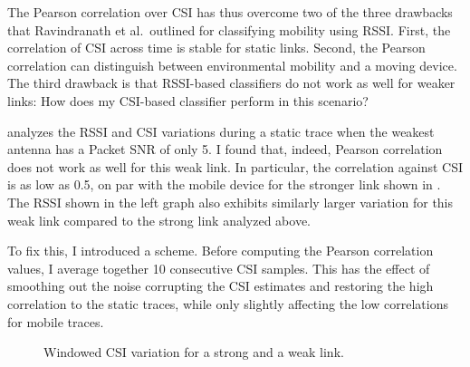 The Pearson correlation over CSI has thus overcome two of the three drawbacks that Ravindranath et al.\ outlined for classifying mobility using RSSI. First, the correlation of CSI across time is stable for static links. Second, the Pearson correlation can distinguish between environmental mobility and a moving device. The third drawback is that RSSI-based classifiers do not work as well for weaker links: How does my CSI-based classifier perform in this scenario? 

 analyzes the RSSI and CSI variations during a static trace when the weakest antenna has a Packet SNR of only 5\dB. I found that, indeed, Pearson correlation does not work as well for this weak link. In particular, the correlation against CSI is as low as 0.5, on par with the mobile device for the stronger link shown in . The RSSI shown in the left graph also exhibits similarly larger variation for this weak link compared to the strong link analyzed above.

To fix this, I introduced a  scheme. Before computing the Pearson correlation values, I average together 10 consecutive CSI samples. This has the effect of smoothing out the noise corrupting the CSI estimates and restoring the high correlation to the static traces, while only slightly affecting the low correlations for mobile traces.

\begin{figure}[tp]
	\centering
	\hspace{0.03\textwidth}%
	\caption[Windowed CSI variation for a strong and a weak link]{\label{fig:mobility_csi_cdf}Windowed CSI variation for a strong and a weak link.}
\end{figure}

